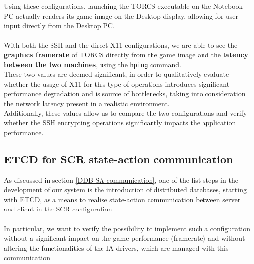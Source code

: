 Using these configurations, launching the TORCS executable on the Notebook PC actually renders its game image on the Desktop display, allowing for user input directly from the Desktop PC. \\ \\
With both the SSH and the direct X11 configurations, we are able to see the \textbf{graphics framerate} of TORCS directly from the game image and the \textbf{latency between the two machines}, using the \texttt{hping} command. \\
These two values are deemed significant, in order to qualitatively evaluate whether the usage of X11 for this type of operations introduces significant performance degradation and is source of bottlenecks, taking into consideration the network latency present in a realistic environment. \\ Additionally, these values allow us to compare the two configurations and verify whether the SSH encrypting operations significantly impacts the application performance.  

\subsection{ETCD for SCR state-action communication}
As discussed in section \ref{DDB-SA-communication}, one of the fist steps in the development of our system is the introduction of distributed databases, starting with ETCD, as a means to realize state-action communication between server and client in the SCR configuration. \\ \\
In particular, we want to verify the possibility to implement such a configuration without a significant impact on the game performance (framerate) and without altering the functionalities of the IA drivers, which are managed with this communication.


